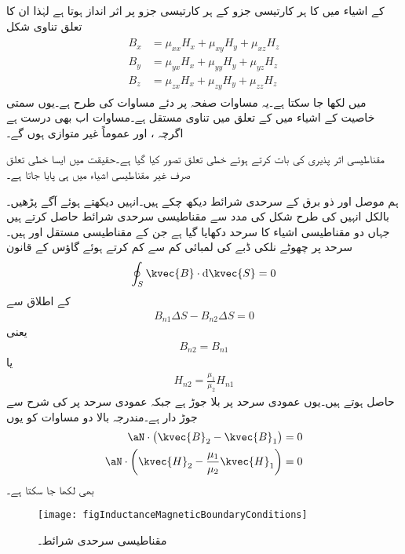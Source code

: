 کے اشیاء میں  کا ہر کارتیسی جزو  کے ہر کارتیسی جزو پر اثر انداز ہوتا ہے لہٰذا ان کا تعلق تناوی شکل
\begin{gather}
\begin{aligned}\label{مساوت_امالہ_تناوی-مساوات}
B_x&=\mu_{xx} H_x +\mu_{xy} H_y+\mu_{xz} H_z\\
B_y&=\mu_{yx} H_x +\mu_{yy} H_y+\mu_{yz} H_z\\
B_z&=\mu_{zx} H_x +\mu_{zy} H_y+\mu_{zz} H_z
\end{aligned}
\end{gather}
میں لکھا جا سکتا ہے۔یہ مساوات صفحہ  پر دئے مساوات  کی طرح ہے۔یوں سمتی خاصیت کے اشیاء میں  کے تعلق میں  تناوی مستقل ہے۔مساوات  اب بھی درست ہے اگرچہ ،  اور  عموماً غیر متوازی ہوں گے۔

مقناطیسی اثر پذیری کی بات کرتے ہوئے خطی تعلق تصور کیا گیا ہے۔حقیقت میں ایسا خطی تعلق صرف غیر مقناطیسی اشیاء میں ہی پایا جاتا ہے۔


ہم موصل اور ذو برق کے سرحدی شرائط دیکھ چکے ہیں۔انہیں دیکھتے ہوئے آگے پڑھیں۔بالکل انہیں کی طرح شکل  کی مدد سے مقناطیسی سرحدی شرائط حاصل کرتے ہیں جہاں دو مقناطیسی اشیاء کا سرحد دکھایا گیا ہے جن کے مقناطیسی مستقل  اور  ہیں۔ سرحد پر چھوٹے نلکی ڈبے کی لمبائی کم سے کم کرتے ہوئے گاؤس کے قانون
\begin{align*}
\oint_S \kvec{B} \cdot \dif \kvec{S}=0
\end{align*}
کے اطلاق سے
\begin{align*}
B_{n1}\Delta S-B_{n2} \Delta S=0
\end{align*}
یعنی
\begin{align}\label{مساوات_امالہ_عمودی_مقناطیسی_میدان_بے_جوڑ_ہے}
B_{n2}=B_{n1}
\end{align}
یا
\begin{align}
H_{n2}=\frac{\mu_1}{\mu_2} H_{n1}
\end{align}
حاصل ہوتے ہیں۔یوں عمودی  سرحد پر بلا جوڑ ہے جبکہ عمودی  سرحد پر  کی شرح سے جوڑ دار ہے۔مندرجہ بالا دو مساوات کو یوں
\begin{align}
\aN  \cdot \left(\kvec{B}_2-\kvec{B}_1 \right)&=0\\
\aN \cdot \left(\kvec{H}_2-\frac{\mu_1}{\mu_2} \kvec{H}_1 \right)&=0
\end{align}
بھی لکھا جا سکتا ہے۔
 \begin{figure}
\centering
\texttt{[image: figInductanceMagneticBoundaryConditions]}
\caption{مقناطیسی سرحدی شرائط۔}
\label{شکل_امالہ_مقناطیسی_سرحدی_شرائط}
\end{figure}

